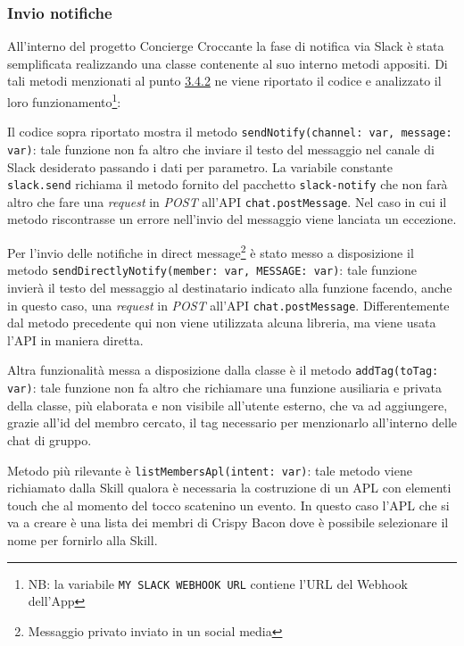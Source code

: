 \subsubsection{Invio notifiche}
All'interno del progetto Concierge Croccante la fase di notifica via Slack è stata semplificata realizzando una classe contenente al suo interno metodi appositi. Di tali metodi menzionati al punto \hyperref[utils]{3.4.2} ne viene riportato il codice e analizzato il loro funzionamento\footnote{NB: la variabile \texttt{MY SLACK WEBHOOK URL} contiene l'URL del Webhook dell'App}: 

Il codice sopra riportato mostra il metodo \texttt{sendNotify(channel:  var, message:  var)}: tale funzione non fa altro che inviare il testo del messaggio nel canale di Slack desiderato passando i dati per parametro. La variabile constante \texttt{slack.send} richiama il metodo fornito del pacchetto \texttt{slack-notify} che non farà altro che fare una \textit{request} in \textit{POST} all'API \texttt{chat.postMessage}. Nel caso in cui il metodo riscontrasse un errore nell'invio del messaggio viene lanciata un eccezione.

\newpage

Per l'invio delle notifiche in direct message\footnote{Messaggio privato inviato in un social media} è stato messo a disposizione il metodo \texttt{sendDirectlyNotify(member:  var, MESSAGE:  var)}: tale funzione invierà il testo del messaggio al destinatario indicato alla funzione facendo, anche in questo caso, una \textit{request} in \textit{POST} all'API \texttt{chat.postMessage}. Differentemente dal metodo precedente qui non viene utilizzata alcuna libreria, ma viene usata l'API in maniera diretta.

\newpage

Altra funzionalità messa a disposizione dalla classe è il metodo \texttt{addTag(toTag: var)}: tale funzione non fa altro che richiamare una funzione ausiliaria e privata della classe, più elaborata e non visibile all'utente esterno, che va ad aggiungere, grazie all'id del membro cercato, il tag necessario per menzionarlo all'interno delle chat di gruppo.

\newpage

Metodo più rilevante è \texttt{listMembersApl(intent: var)}: tale metodo viene richiamato dalla Skill qualora è necessaria la costruzione di un APL con elementi touch che al momento del tocco scatenino un evento. In questo caso l'APL che si va a creare è una lista dei membri di Crispy Bacon dove è possibile selezionare il nome per fornirlo alla Skill. 

